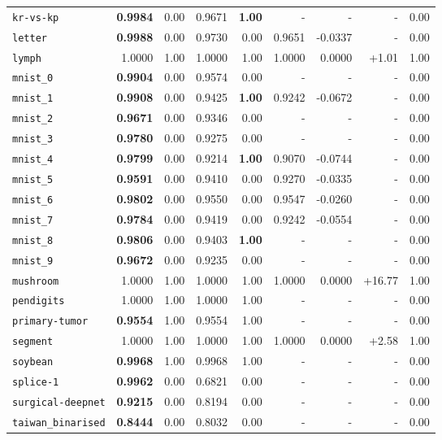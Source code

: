 \begin{tabular}{lrrrrrrrr}
\texttt{kr-vs-kp} & \textbf{0.9984} & 0.00 & 0.9671 & \textbf{1.00} & - & - & - & 0.00\\
\texttt{letter} & \textbf{0.9988} & 0.00 & 0.9730 & 0.00 & 0.9651 & -0.0337 & - & 0.00\\
\texttt{lymph} & 1.0000 & 1.00 & 1.0000 & 1.00 & 1.0000 & 0.0000 & +1.01 & 1.00\\
\texttt{mnist\_0} & \textbf{0.9904} & 0.00 & 0.9574 & 0.00 & - & - & - & 0.00\\
\texttt{mnist\_1} & \textbf{0.9908} & 0.00 & 0.9425 & \textbf{1.00} & 0.9242 & -0.0672 & - & 0.00\\
\texttt{mnist\_2} & \textbf{0.9671} & 0.00 & 0.9346 & 0.00 & - & - & - & 0.00\\
\texttt{mnist\_3} & \textbf{0.9780} & 0.00 & 0.9275 & 0.00 & - & - & - & 0.00\\
\texttt{mnist\_4} & \textbf{0.9799} & 0.00 & 0.9214 & \textbf{1.00} & 0.9070 & -0.0744 & - & 0.00\\
\texttt{mnist\_5} & \textbf{0.9591} & 0.00 & 0.9410 & 0.00 & 0.9270 & -0.0335 & - & 0.00\\
\texttt{mnist\_6} & \textbf{0.9802} & 0.00 & 0.9550 & 0.00 & 0.9547 & -0.0260 & - & 0.00\\
\texttt{mnist\_7} & \textbf{0.9784} & 0.00 & 0.9419 & 0.00 & 0.9242 & -0.0554 & - & 0.00\\
\texttt{mnist\_8} & \textbf{0.9806} & 0.00 & 0.9403 & \textbf{1.00} & - & - & - & 0.00\\
\texttt{mnist\_9} & \textbf{0.9672} & 0.00 & 0.9235 & 0.00 & - & - & - & 0.00\\
\texttt{mushroom} & 1.0000 & 1.00 & 1.0000 & 1.00 & 1.0000 & 0.0000 & +16.77 & 1.00\\
\texttt{pendigits} & 1.0000 & 1.00 & 1.0000 & 1.00 & - & - & - & 0.00\\
\texttt{primary-tumor} & \textbf{0.9554} & 1.00 & 0.9554 & 1.00 & - & - & - & 0.00\\
\texttt{segment} & 1.0000 & 1.00 & 1.0000 & 1.00 & 1.0000 & 0.0000 & +2.58 & 1.00\\
\texttt{soybean} & \textbf{0.9968} & 1.00 & 0.9968 & 1.00 & - & - & - & 0.00\\
\texttt{splice-1} & \textbf{0.9962} & 0.00 & 0.6821 & 0.00 & - & - & - & 0.00\\
\texttt{surgical-deepnet} & \textbf{0.9215} & 0.00 & 0.8194 & 0.00 & - & - & - & 0.00\\
\texttt{taiwan\_binarised} & \textbf{0.8444} & 0.00 & 0.8032 & 0.00 & - & - & - & 0.00\\

\end{tabular}
